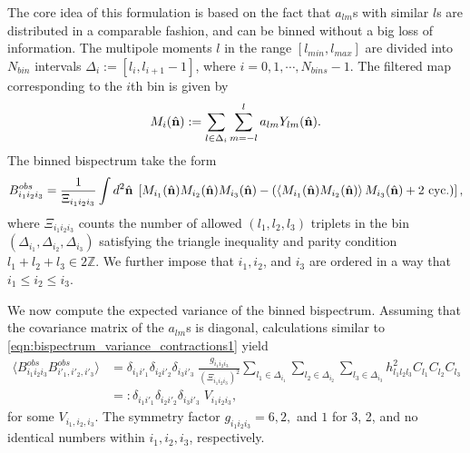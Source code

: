 The core idea of this formulation is based on the fact that $a_{lm}$s with similar $l$s are distributed in a comparable fashion, and can be binned without a big loss of information. The multipole moments $l$ in the range $[l_{min},l_{max}]$ are divided into $N_{bin}$ intervals $\Delta_i := [l_i,l_{i+1}-1]$, where $i=0,1,\cdots,N_{bins}-1$.  The filtered map corresponding to the $i$th bin is given by
\begin{align}
		M_i(\hat{\mathbf{n}}) := \sum_{l\in\Delta_i}\sum_{m=-l}^{l} a_{lm} Y_{lm}(\hat{\mathbf{n}}).
\end{align}
The binned bispectrum take the form
\begin{align}
	B^{obs}_{i_1 i_2 i_3} = \frac{1}{\Xi_{i_1 i_2 i_3}} \int d^2 \hat{\mathbf{n}} \; \left[ M_{i_1} (\hat{\mathbf{n}}) M_{i_2} (\hat{\mathbf{n}}) M_{i_3} (\hat{\mathbf{n}}) - \left( \left< M_{i_1} (\hat{\mathbf{n}}) M_{i_2} (\hat{\mathbf{n}}) \right> M_{i_3} (\hat{\mathbf{n}}) + \text{2 cyc.}\right)  \right],
\end{align}
where $\Xi_{i_1 i_2 i_3}$ counts the number of allowed $(l_1,l_2,l_3)$ triplets in the bin $(\Delta_{i_1},\Delta_{i_2},\Delta_{i_3})$ satisfying the triangle inequality and parity condition $l_1+l_2+l_3 \in 2\mathbb{Z}$. We further impose that $i_1,i_2$, and $i_3$ are ordered in a way that $i_1 \le i_2 \le i_3$.

We now compute the expected variance of the binned bispectrum. Assuming that the covariance matrix of the $a_{lm}$s is diagonal, calculations similar to \eqref{eqn:bispectrum_variance_contractions1} yield
\begin{align}
	\langle B^{obs}_{i_1 i_2 i_3} B^{obs}_{i'_1,i'_2,i'_3} \rangle &=  \delta_{i_1 i'_1} \delta_{i_2 i'_2} \delta_{i_3 i'_3} \; \frac{g_{i_1 i_2 i_3}}{(\Xi_{i_1 i_2 i_3})^2} \sum_{l_1 \in \Delta_{i_1}} \sum_{l_2 \in \Delta_{i_2}} \sum_{l_3 \in \Delta_{i_3}} h^2_{l_1 l_2 l_3} C_{l_1} C_{l_2} C_{l_3} \\
	&=: \delta_{i_1 i'_1} \delta_{i_2 i'_2} \delta_{i_3 i'_3} \; V_{i_1 i_2 i_3},
\end{align}
for some $V_{i_1,i_2,i_3}$. The symmetry factor $g_{i_1 i_2 i_3}=6,2,$ and $1$ for 3, 2, and no identical numbers within $i_1,i_2,i_3$, respectively.

